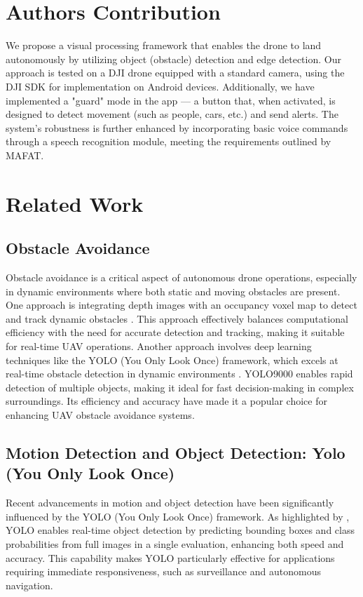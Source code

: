 \documentclass[unnumsec,webpdf,modern,large]{mam-authoring-template}%
\begin{document}
\section{Authors Contribution}\label{sec2}
We propose a visual processing framework that enables the drone to land autonomously by utilizing object (obstacle) detection and edge detection. Our approach is tested on a DJI drone equipped with a standard camera, using the DJI SDK for implementation on Android devices. Additionally, we have implemented a "guard" mode in the app — a button that, when activated, is designed to detect movement (such as people, cars, etc.) and send alerts. The system's robustness is further enhanced by incorporating basic voice commands through a speech recognition module, meeting the requirements outlined by MAFAT.

\section{Related Work}\label{sec3}
\subsection{Obstacle Avoidance}
Obstacle avoidance is a critical aspect of autonomous drone operations, especially in dynamic environments where both static and moving obstacles are present. One approach is integrating depth images with an occupancy voxel map to detect and track dynamic obstacles \cite{xu2023real}. 
This approach effectively balances computational efficiency with the need for accurate detection and tracking, making it suitable for real-time UAV operations. Another approach involves deep learning techniques like the YOLO (You Only Look Once) framework, which excels at real-time obstacle detection in dynamic environments \cite{redmon2017yolo9000}. YOLO9000 enables rapid detection of multiple objects, making it ideal for fast decision-making in complex surroundings. Its efficiency and accuracy have made it a popular choice for enhancing UAV obstacle avoidance systems.

\subsection{Motion Detection and Object Detection: Yolo (You Only Look Once)}
Recent advancements in motion and object detection have been significantly influenced by the YOLO (You Only Look Once) framework. As highlighted by \cite{dahirou2021motion}, YOLO enables real-time object detection by predicting bounding boxes and class probabilities from full images in a single evaluation, enhancing both speed and accuracy. This capability makes YOLO particularly effective for applications requiring immediate responsiveness, such as surveillance and autonomous navigation.
\end{document}
